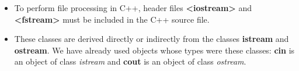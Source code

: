 \documentclass[12pt , a4paper]{article}
\newcommand{\hl}[1]{\colorbox{coolblack}{\color{cream}\textbf{#1}\color{black}}}
\begin{document}

	\begin{importantBox}
		\begin{itemize}
			\item To perform file processing in C++, header files \hl{<iostream>} and \hl{<fstream>} must be included in the C++ source file.
			\item These classes are derived directly or indirectly from the classes \textbf{istream} and \textbf{ostream}. We have already used objects whose types were these classes: \textbf{cin} is an object of class \emph{istream} and \textbf{cout} is an object of class \emph{ostream}.
		\end{itemize}
	\end{importantBox}
\end{document}
